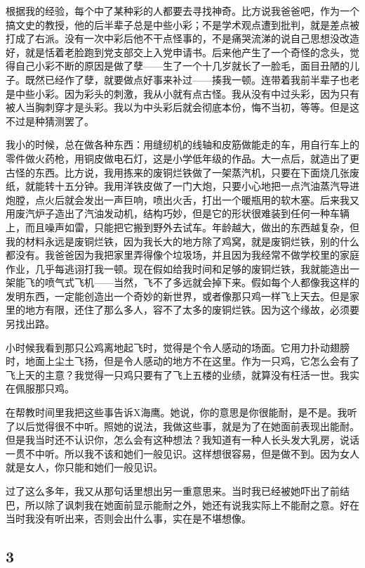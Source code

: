 根据我的经验，每个中了某种彩的人都要去寻找神奇。比方说我爸爸吧，作为一个搞文史的教授，他的后半辈子总是中些小彩；不是学术观点遭到批判，就是差点被打成了右派。没有一次中彩后他不干点怪事的，不是痛哭流涕的说自己思想没改造好，就是恬着老脸跑到党支部交上入党申请书。后来他产生了一个奇怪的念头，觉得自己小彩不断的原因是做了孽——生了一个十几岁就长了一脸毛，面目丑陋的儿子。既然已经作了孽，就要做点好事来补过——揍我一顿。连带着我前半辈子也老是中些小彩。因为彩头的刺激，我从小就有点古怪。我从没有中过头彩，因为只有被人当胸刺穿才是头彩。我以为中头彩后就会彻底本份，悔不当初，等等。但是这不过是种猜测罢了。 

我小的时候，总在做各种东西：用缝纫机的线轴和皮筋做能走的车，用自行车上的零件做火药枪，用铜皮做电石灯，这是小学低年级的作品。大一点后，就造出了更古怪的东西。比方说，我用拣来的废铜烂铁做了一架蒸汽机，只要在下面烧几张废纸，就能转十五分钟。我用洋铁皮做了一门大炮，只要小心地把一点汽油蒸汽导进炮膛，点火后就会发出一声巨响，喷出火舌，打出一个暖瓶用的软木塞。后来我又用废汽炉子造出了汽油发动机，结构巧妙，但是它的形状很难装到任何一种车辆上，而且噪声如雷，只能把它搬到野外去试车。年龄越大，做出的东西越复杂，但我的材料永远是废铜烂铁，因为我长大的地方除了鸡窝，就是废铜烂铁，别的什么都没有。我爸爸因为我把家里弄得像个垃圾场，并且因为我经常不做学校里的家庭作业，几乎每逃诩打我一顿。现在假如给我时间和足够的废铜烂铁，我就能造出一架能飞的喷气式飞机——当然，飞不了多远就会掉下来。假如每个人都像我这样的发明东西，一定能创造出一个奇妙的新世界，或者像那只鸡一样飞上天去。但是家里的地方有限，还住了那么多人，容不了太多的废铜烂铁。因为这个缘故，必须要另找出路。 

小时候我看到那只公鸡离地起飞时，觉得是个令人感动的场面。它用力扑动翅膀时，地面上尘土飞扬，但是令人感动的地方不在这里。作为一只鸡，它怎么会有了飞上天的主意？我觉得一只鸡只要有了飞上五楼的业绩，就算没有枉活一世。我实在佩服那只鸡。 

在帮教时间里我把这些事告诉X海鹰。她说，你的意思是你很能耐，是不是。我听了以后觉得很不中听。照她的说法，我做这些事，就是为了在她面前表现出能耐。但是我当时还不认识你，怎么会有这种想法？我知道有一种人长头发大乳房，说话一贯不中听。所以我不该和她们一般见识。这样想很容易，但是做不到。因为女人就是女人，你只能和她们一般见识。 

过了这么多年，我又从那句话里想出另一重意思来。当时我已经被她吓出了前结巴，所以除了讽刺我在她面前显示能耐之外，她还有说我实际上不能耐之意。好在当时我没有听出来，否则会出什么事，实在是不堪想像。 

\subsection{3} 


